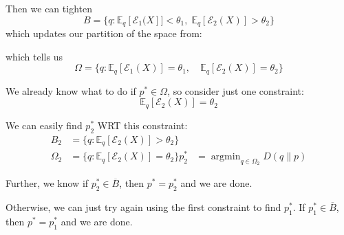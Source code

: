 \documentclass[12pt]{report}
\newcommand{\E}{\mathbb{E}}
\newcommand{\Ec}{\mathcal{E}}
\renewcommand{\bar}[1]{\overline{#1}}
\DeclareMathOperator*{\argmin}{\arg\min}
\begin{document}
Then we can tighten
\[B = \{q: \E_q[\Ec_1(X]]< \theta_1, \; \E_q[\Ec_2(X)] > \theta_2\}\]
which updates our partition of the space from:

\begin{center}
    \hspace{1cm}
    \hspace{1cm}
\end{center}
which tells us
\[\Omega = \{q: \E_q[\Ec_1(X)] = \theta_1, \quad \E_q[\Ec_2(X)] = \theta_2\} \]

We already know what to do if $p^* \in \Omega$, so consider just one constraint:
\[\E_q[\Ec_2(X)] = \theta_2\]

We can easily find $p_2^*$ WRT this constraint:
\begin{align*}
    B_2      & = \{q: \E_q[\Ec_2(X)] > \theta_2\}          \\
    \Omega_2 & = \{q: \E_q[\Ec_2(X)] = \theta_2\}
    p_2^*    & = \argmin_{q \in \Omega_2} D(q \parallel p)
\end{align*}

Further, we know if $p_2^* \in \bar B$, then $p^* = p_2^*$ and we are done.

Otherwise, we can just try again using the first constraint to find $p_1^*$. If $p_1^* \in \bar B$, then $p^* = p_1^*$ and we are done.
\end{document}
